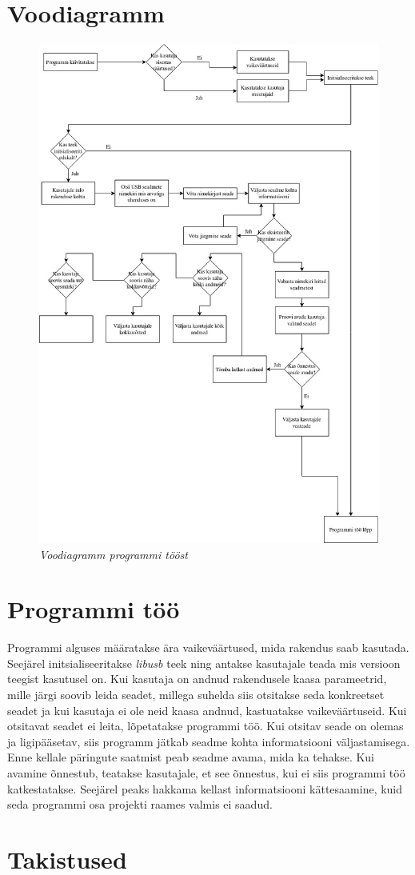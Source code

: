 \section{Voodiagramm}
\begin{figure}[ht]
    \centering
    \includegraphics[width=.5\textwidth]{figures/flowchart.jpg}
    \caption{\textit{Voodiagramm programmi tööst}}
    \label{fig:flowchart}
\end{figure}


\section{Programmi töö}\label{sec:programmi-too}
Programmi alguses määratakse ära vaikeväärtused, mida rakendus saab kasutada.
Seejärel initsialiseeritakse \textit{libusb} teek ning antakse kasutajale teada mis versioon teegist kasutusel on.
Kui kasutaja on andnud rakendusele kaasa parameetrid, mille järgi soovib leida seadet, millega suhelda siis otsitakse seda konkreetset seadet ja kui kasutaja ei ole neid kaasa andnud, kastuatakse vaikeväärtuseid.
Kui otsitavat seadet ei leita, lõpetatakse programmi töö.
Kui otsitav seade on olemas ja ligipääsetav, siis programm jätkab seadme kohta informatsiooni väljastamisega.
Enne kellale päringute saatmist peab seadme avama, mida ka tehakse.
Kui avamine õnnestub, teatakse kasutajale, et see õnnestus, kui ei siis programmi töö katkestatakse.
Seejärel peaks hakkama kellast informatsiooni kättesaamine, kuid seda programmi osa projekti raames valmis ei saadud.

\section{Takistused}
